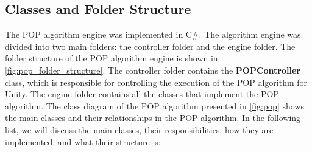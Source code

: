 \subsection{Classes and Folder Structure} \label{subsec:class_diagram_and_folder_structure}
The \ac{POP} algorithm engine was implemented in C\#. The algorithm engine was divided into two main folders: the controller folder and the engine folder. The folder structure of the \ac{POP} algorithm engine is shown in \autoref{fig:pop_folder_structure}. The controller folder contains the \textbf{POPController} class, which is responsible for controlling the execution of the \ac{POP} algorithm for Unity. The engine folder contains all the classes that implement the \ac{POP} algorithm.
The class diagram of the \ac{POP} algorithm presented in \autoref{fig:pop} shows the main classes and their relationships in the \ac{POP} algorithm. In the following list, we will discuss the main classes, their responsibilities, how they are implemented, and what their structure is:
